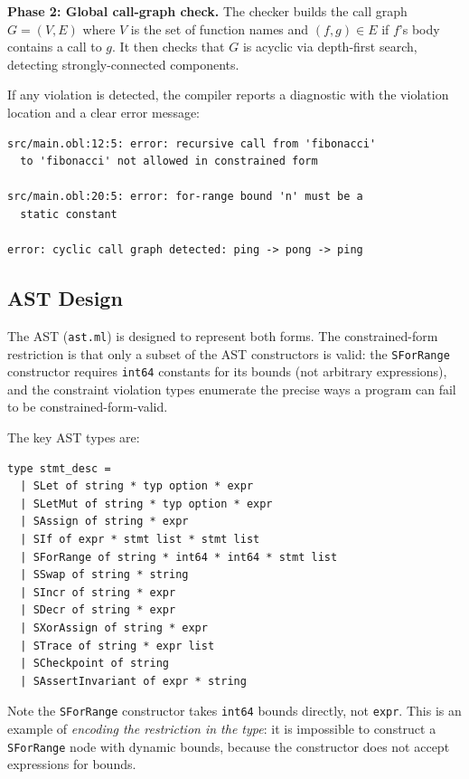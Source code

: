\documentclass[11pt,a4paper]{article}
\begin{document}
\textbf{Phase 2: Global call-graph check.}  The checker builds the call graph
$G = (V, E)$ where $V$ is the set of function names and $(f, g) \in E$ if
$f$'s body contains a call to $g$.  It then checks that $G$ is acyclic via
depth-first search, detecting strongly-connected components.

If any violation is detected, the compiler reports a diagnostic with the
violation location and a clear error message:

\begin{lstlisting}[language={},caption={Constrained-form violation diagnostics}]
src/main.obl:12:5: error: recursive call from 'fibonacci'
  to 'fibonacci' not allowed in constrained form

src/main.obl:20:5: error: for-range bound 'n' must be a
  static constant

error: cyclic call graph detected: ping -> pong -> ping
\end{lstlisting}

\subsection{AST Design}

The AST (\texttt{ast.ml}) is designed to represent both forms.  The
constrained-form restriction is that only a subset of the AST constructors is
valid: the \texttt{SForRange} constructor requires \texttt{int64} constants
for its bounds (not arbitrary expressions), and the constraint violation types
enumerate the precise ways a program can fail to be constrained-form-valid.

The key AST types are:

\begin{lstlisting}[language=ocaml-ast,caption={Core AST types (excerpt)}]
type stmt_desc =
  | SLet of string * typ option * expr
  | SLetMut of string * typ option * expr
  | SAssign of string * expr
  | SIf of expr * stmt list * stmt list
  | SForRange of string * int64 * int64 * stmt list
  | SSwap of string * string
  | SIncr of string * expr
  | SDecr of string * expr
  | SXorAssign of string * expr
  | STrace of string * expr list
  | SCheckpoint of string
  | SAssertInvariant of expr * string
\end{lstlisting}

Note the \texttt{SForRange} constructor takes \texttt{int64} bounds directly,
not \texttt{expr}.  This is an example of \emph{encoding the restriction in
the type}: it is impossible to construct a \texttt{SForRange} node with
dynamic bounds, because the constructor does not accept expressions for
bounds.
\end{document}
